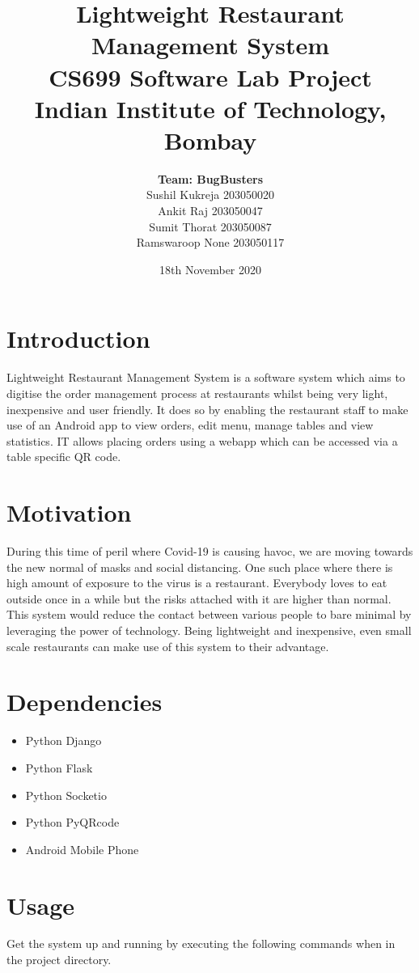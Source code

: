 \documentclass{article}
\title{\textbf{Lightweight Restaurant Management System} \\CS699 Software Lab Project \\Indian Institute of Technology, Bombay}
\author{\textbf{Team: BugBusters}\\ Sushil Kukreja 203050020\\ Ankit Raj 203050047\\ Sumit Thorat 203050087\\ Ramswaroop None 203050117}
\date{18th November 2020}
\begin{document}
\maketitle

\section{Introduction}
Lightweight Restaurant Management System is a software system which aims to digitise the order management process at restaurants whilst being very light, inexpensive and user friendly. It does so by enabling the restaurant staff to make use of an Android app to view orders, edit menu, manage tables and view statistics. IT allows placing orders using a webapp which can be accessed via a table specific QR code. 

\section{Motivation}
During this time of peril where Covid-19 is causing havoc, we are moving
towards the new normal of masks and social distancing. One such place where there is high amount of exposure to the virus is a
restaurant. Everybody loves to eat outside once in a while but the risks
attached with it are higher than normal. This system would reduce the contact between various people to bare minimal by leveraging the power of technology. Being lightweight and inexpensive, even small scale restaurants can make use of this system to their advantage.

\section{Dependencies}
\begin{itemize}

    \item{Python Django}
    
    \item{Python Flask}
    
    \item{Python Socketio}
    
    \item{Python PyQRcode}
    
    \item{Android Mobile Phone}

\end{itemize}

\section{Usage}
Get the system up and running by executing the following commands when in the project directory.
\end{document}
